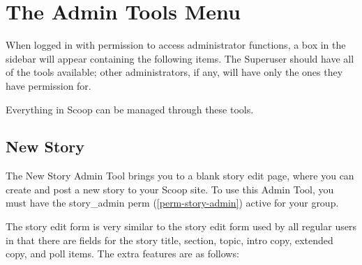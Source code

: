\section{The Admin Tools Menu}
\label{admin-tools}

When logged in with permission to access administrator functions, a box in the sidebar will appear containing the following items.  The Superuser should have all of the tools available; other administrators, if any, will have only the ones they have permission for.

Everything in Scoop can be managed through these tools.

\subsection{New Story}
\label{admin-tools-new-story}

The New Story Admin Tool brings you to a blank story edit page, where you can create and post a new story to your Scoop site.  To use this Admin Tool, you must have the story\_admin perm (\ref{perm-story-admin}) active for your group.

The story edit form is very similar to the story edit form used by all regular users in that there are fields for the story title, section, topic, intro copy, extended copy, and poll items.  The extra features are as follows:



